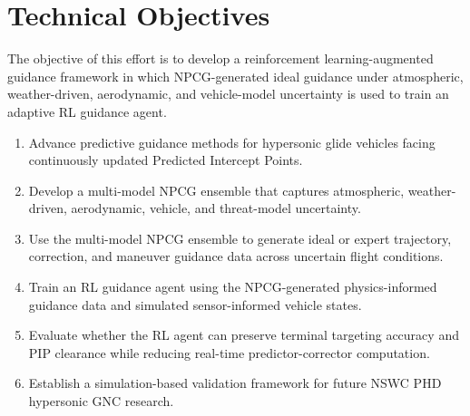 \section{Technical Objectives}

The objective of this effort is to develop a reinforcement learning-augmented guidance framework in which NPCG-generated ideal guidance under atmospheric, weather-driven, aerodynamic, and vehicle-model uncertainty is used to train an adaptive RL guidance agent.

\begin{enumerate}
  \item Advance predictive guidance methods for hypersonic glide vehicles facing continuously updated Predicted Intercept Points.
  \item Develop a multi-model NPCG ensemble that captures atmospheric, weather-driven, aerodynamic, vehicle, and threat-model uncertainty.
  \item Use the multi-model NPCG ensemble to generate ideal or expert trajectory, correction, and maneuver guidance data across uncertain flight conditions.
  \item Train an RL guidance agent using the NPCG-generated physics-informed guidance data and simulated sensor-informed vehicle states.
  \item Evaluate whether the RL agent can preserve terminal targeting accuracy and PIP clearance while reducing real-time predictor-corrector computation.
  \item Establish a simulation-based validation framework for future NSWC PHD hypersonic GNC research.
\end{enumerate}
